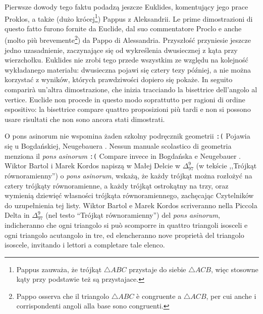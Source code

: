 Pierwsze dowody tego faktu podadzą jeszcze Euklides, komentujący jego prace Proklos, a także (dużo krócej\footnote{Pappus zauważa, że trójkąt $\triangle ABC$ przystaje do siebie $\triangle ACB$, więc stosowne kąty przy podstawie też są przystajace.}) Pappus z Aleksandrii. %
Le prime dimostrazioni di questo fatto furono fornite da Euclide, dal suo commentatore Proclo e anche (molto più brevemente\footnote{Pappo osserva che il triangolo $\triangle ABC$ è congruente a $\triangle ACB$, per cui anche i corrispondenti angoli alla base sono congruenti.}) da Pappo di Alessandria. %
Przyszłość przyniesie jeszcze jedno uzasadnienie, zaczynające się od wykreślenia dwusiecznej z kąta przy wierzchołku. %
Euklides nie zrobi tego przede wszystkim ze względu na kolejność wykładanego materiału: dwusieczna pojawi się cztery tezy później, a nie można korzystać z wyników, których prawdziwości dopiero się pokaże. %
In seguito comparirà un'altra dimostrazione, che inizia tracciando la bisettrice dell'angolo al vertice. %
Euclide non procede in questo modo soprattutto per ragioni di ordine espositivo: la bisettrice compare quattro proposizioni più tardi e non si possono usare risultati che non sono ancora stati dimostrati. %

O pons asinorum nie wspomina żaden szkolny podręcznik geometrii \texttt{:(} %
Pojawia się u Bogdańskiej, Neugebauera \cite[s. 9]{neugebauer_2018}. %
Nessun manuale scolastico di geometria menziona il \emph{pons asinorum} \texttt{:(} %
Compare invece in Bogdańska e Neugebauer \cite[p. 9]{neugebauer_2018}. %
Wiktor Bartol i Marek Kordos napiszą w Małej Delcie w $\Delta_{97}^9$ (w tekście ,,Trójkąt równoramienny'') o \emph{pons asinorum}, wskażą, że każdy trójkąt można rozłożyć na cztery trójkąty równoramienne, a każdy trójkąt ostrokątny na trzy, oraz wymienią dziewięć własności trójkąta równoramiennego, zachęcając Czytelników do uzupełnienia tej listy. %
Wiktor Bartol e Marek Kordos scriveranno nella Piccola Delta in $\Delta_{97}^9$ (nel testo ``Trójkąt równoramienny'') del \emph{pons asinorum}, indicheranno che ogni triangolo si può scomporre in quattro triangoli isosceli e ogni triangolo acutangolo in tre, ed elencheranno nove proprietà del triangolo isoscele, invitando i lettori a completare tale elenco. %



%